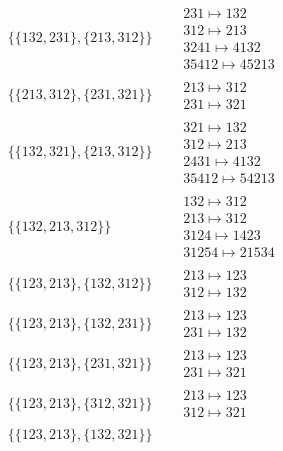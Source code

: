 \begin{tiny}
\begin{align}
\begin{matrix}
\end{matrix}
\\
\{\{132, 231\}, \{213, 312\}\}
\quad
&
\begin{matrix}
231 \mapsto 132\\312 \mapsto 213\\3241 \mapsto 4132\\35412 \mapsto 45213
\end{matrix}
\\
\{\{213, 312\}, \{231, 321\}\}
\quad
&
\begin{matrix}
213 \mapsto 312\\231 \mapsto 321
\end{matrix}
\\
\{\{132, 321\}, \{213, 312\}\}
\quad
&
\begin{matrix}
321 \mapsto 132\\312 \mapsto 213\\2431 \mapsto 4132\\35412 \mapsto 54213
\end{matrix}
\\
\{\{132, 213, 312\}\}
\quad
&
\begin{matrix}
132 \mapsto 312\\213 \mapsto 312\\3124 \mapsto 1423\\31254 \mapsto 21534
\end{matrix}
\\
\{\{123, 213\}, \{132, 312\}\}
\quad
&
\begin{matrix}
213 \mapsto 123\\312 \mapsto 132
\end{matrix}
\\
\{\{123, 213\}, \{132, 231\}\}
\quad
&
\begin{matrix}
213 \mapsto 123\\231 \mapsto 132
\end{matrix}
\\
\{\{123, 213\}, \{231, 321\}\}
\quad
&
\begin{matrix}
213 \mapsto 123\\231 \mapsto 321
\end{matrix}
\\
\{\{123, 213\}, \{312, 321\}\}
\quad
&
\begin{matrix}
213 \mapsto 123\\312 \mapsto 321
\end{matrix}
\\
\{\{123, 213\}, \{132, 321\}\}
\quad
&
\begin{matrix}

\end{matrix}
\end{align}
\end{tiny}
